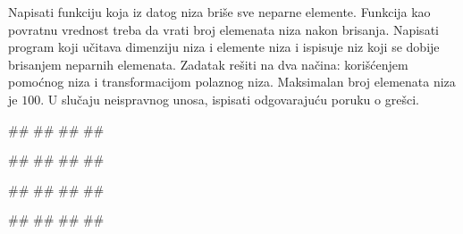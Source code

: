 \begin{Exercise}[label=p.izbacivanje_elemenata]
Napisati funkciju koja iz datog niza briše sve neparne elemente. Funkcija kao povratnu vrednost treba
da vrati broj elemenata niza nakon brisanja. 
Napisati program koji učitava dimenziju niza i elemente niza i ispisuje niz koji se dobije 
brisanjem neparnih elemenata.
Zadatak rešiti na dva načina: korišćenjem pomoćnog niza i transformacijom polaznog niza.
Maksimalan broj elemenata niza je $100$.
U slučaju neispravnog unosa, ispisati odgovarajuću poruku o grešci. 
 
\begin{miditest}
\begin{upotreba}{1}
#\naslovInt#
##
##
##
\end{upotreba}
\end{miditest}
\begin{miditest}
\begin{upotreba}{2}
#\naslovInt#
##
##
##
\end{upotreba}
\end{miditest}

\begin{miditest}
\begin{upotreba}{3}
#\naslovInt#
##
##
#\izlaz{}#
\end{upotreba}
\end{miditest}

\begin{maxitest}
\begin{upotreba}{4}
#\naslovInt#
##
##
##
\end{upotreba}
\end{maxitest}
\end{Exercise}

\ifresenja
\begin{Answer}[ref=p.izbacivanje_elemenata]
\end{Answer}
\fi


